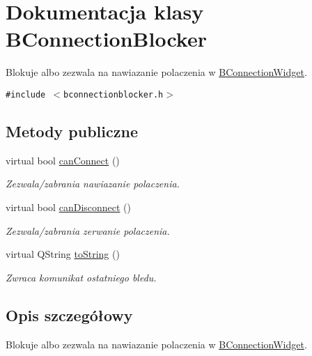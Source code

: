 \hypertarget{class_b_connection_blocker}{
\section{Dokumentacja klasy BConnectionBlocker}
\label{class_b_connection_blocker}
}
Blokuje albo zezwala na nawiazanie polaczenia w \hyperlink{class_b_connection_widget}{BConnectionWidget}.  


{\tt \#include $<$bconnectionblocker.h$>$}

\subsection*{Metody publiczne}
\begin{CompactItemize}
\item 
virtual bool \hyperlink{class_b_connection_blocker_2ebcdef0e5570c7331036dd5b6ba4448}{canConnect} ()
\begin{CompactList}\small\item\em Zezwala/zabrania nawiazanie polaczenia. \item\end{CompactList}\item 
virtual bool \hyperlink{class_b_connection_blocker_81e8782c93ac1943a7e19b4ed7ced792}{canDisconnect} ()
\begin{CompactList}\small\item\em Zezwala/zabrania zerwanie polaczenia. \item\end{CompactList}\item 
\hypertarget{class_b_connection_blocker_dbf0d87dd3869926916e7bd956fbbc11}{
virtual QString \hyperlink{class_b_connection_blocker_dbf0d87dd3869926916e7bd956fbbc11}{toString} ()}
\label{class_b_connection_blocker_dbf0d87dd3869926916e7bd956fbbc11}

\begin{CompactList}\small\item\em Zwraca komunikat ostatniego bledu. \item\end{CompactList}\end{CompactItemize}


\subsection{Opis szczegółowy}
Blokuje albo zezwala na nawiazanie polaczenia w \hyperlink{class_b_connection_widget}{BConnectionWidget}. 

